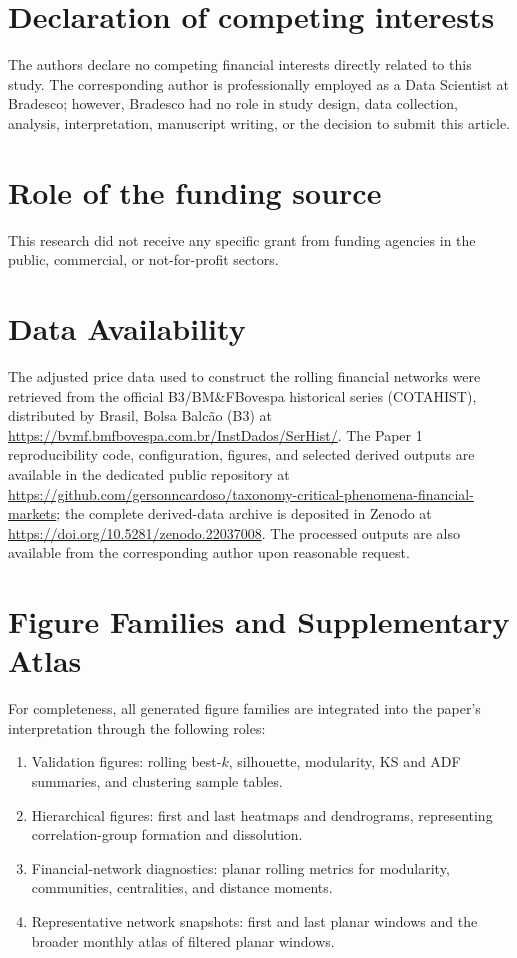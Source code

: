 \documentclass[a4paper,fleqn,review]{cas-sc}
\begin{document}
\section*{Declaration of competing interests}
The authors declare no competing financial interests directly related to this study. The corresponding author is professionally employed as a Data Scientist at Bradesco; however, Bradesco had no role in study design, data collection, analysis, interpretation, manuscript writing, or the decision to submit this article.

\section*{Role of the funding source}
This research did not receive any specific grant from funding agencies in the public, commercial, or not-for-profit sectors.

\section*{Data Availability}
The adjusted price data used to construct the rolling financial networks were retrieved from the official B3/BM\&FBovespa historical series (COTAHIST), distributed by Brasil, Bolsa Balc\~ao (B3) at \url{https://bvmf.bmfbovespa.com.br/InstDados/SerHist/}. The Paper 1 reproducibility code, configuration, figures, and selected derived outputs are available in the dedicated public repository at \url{https://github.com/gersonncardoso/taxonomy-critical-phenomena-financial-markets}; the complete derived-data archive is deposited in Zenodo at \url{https://doi.org/10.5281/zenodo.22037008}. The processed outputs are also available from the corresponding author upon reasonable request.

\FloatBarrier
\appendix
{}

\section{Figure Families and Supplementary Atlas}

For completeness, all generated figure families are integrated into the paper's interpretation through the following roles:
\begin{enumerate}
    \item Validation figures: rolling best-$k$, silhouette, modularity, KS and ADF summaries, and clustering sample tables.
    \item Hierarchical figures: first and last heatmaps and dendrograms, representing correlation-group formation and dissolution.
    \item Financial-network diagnostics: planar rolling metrics for modularity, communities, centralities, and distance moments.
    \item Representative network snapshots: first and last planar windows and the broader monthly atlas of filtered planar windows.
\end{enumerate}
\end{document}
